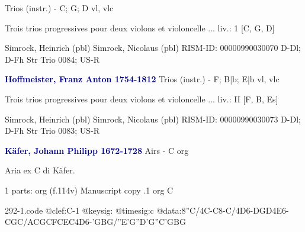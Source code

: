 \documentclass[twocolumn]{book}
\begin{document}
\newline Trios (instr.) - C; G; D
 vl, vlc
\newline \begin{itshape}Trois trios progressives pour deux violons et violoncelle ... liv.: 1 [C, G, D]\end{itshape} 
\newline Simrock, Heinrich  (pbl)
\newline Simrock, Nicolaus  (pbl)
\newline RISM-ID: 00000990030070
\newline D-Dl; D-Fh  Str Trio 0084; US-R
\newline \par \vspace{7pt} \textcolor{darkblue}{\textbf{Hoffmeister, Franz Anton  1754-1812}}
\newline Trios (instr.) - F; B|b; E|b
 vl, vlc
\newline \begin{itshape}Trois trios progressives pour deux violons et violoncelle ... liv.: II [F, B, Es]\end{itshape} 
\newline Simrock, Heinrich  (pbl)
\newline Simrock, Nicolaus  (pbl)
\newline RISM-ID: 00000990030073
\newline D-Dl; D-Fh  Str Trio 0083; US-R
\newline \par \vspace{7pt} \textcolor{darkblue}{\textbf{Käfer, Johann Philipp  1672-1728}}
\newline Airs - C
\newline org
\newline \begin{itshape}[f.114v, heading:] Aria ex C di Käfer.\end{itshape} 
\newline \textcolor{darkblue}{}  1 parts: org  (f.114v)
\newline Manuscript copy
.1  org  C  
\begin{filecontents*}{292-1.code}
@clef:C-1
@keysig:
@timesig:c
@data:8''C/4C-C8-C/4D6-{DGD}4E6-{CGC}/{ACGC}{FCEC}4D6-{'GBG}/{''E'G''D'G}{''C'GBG}
\end{filecontents*}
\newline
%
\end{document}
